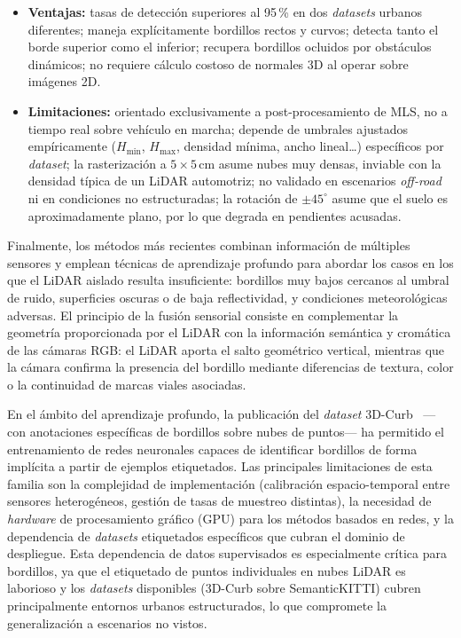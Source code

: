 \begin{itemize}
    \item \textbf{Ventajas:} tasas de detección superiores al 95\,\% en
    dos \textit{datasets} urbanos diferentes; maneja explícitamente
    bordillos rectos y curvos; detecta tanto el borde superior como el
    inferior; recupera bordillos ocluidos por obstáculos dinámicos; no
    requiere cálculo costoso de normales 3D al operar sobre imágenes
    2D.
    \item \textbf{Limitaciones:} orientado exclusivamente a
    post-procesamiento de MLS, no a tiempo real sobre vehículo en
    marcha; depende de umbrales ajustados empíricamente ($H_{\min}$,
    $H_{\max}$, densidad mínima, ancho lineal\ldots) específicos por
    \textit{dataset}; la rasterización a $5 \times 5$\,cm asume nubes
    muy densas, inviable con la densidad típica de un LiDAR automotriz;
    no validado en escenarios \textit{off-road} ni en condiciones no
    estructuradas; la rotación de $\pm 45^{\circ}$ asume que el suelo
    es aproximadamente plano, por lo que degrada en pendientes
    acusadas.
\end{itemize}

Finalmente, los métodos más recientes combinan información de múltiples
sensores y emplean técnicas de aprendizaje profundo para abordar los
casos en los que el LiDAR aislado resulta insuficiente: bordillos muy
bajos cercanos al umbral de ruido, superficies oscuras o de baja
reflectividad, y condiciones meteorológicas adversas. El principio de
la fusión sensorial consiste en complementar la geometría proporcionada
por el LiDAR con la información semántica y cromática de las cámaras
RGB: el LiDAR aporta el salto geométrico vertical, mientras que la
cámara confirma la presencia del bordillo mediante diferencias de
textura, color o la continuidad de marcas viales asociadas.

En el ámbito del aprendizaje profundo, la publicación del
\textit{dataset} 3D-Curb~\cite{zhao2024curbnet} ---con anotaciones
específicas de bordillos sobre nubes de puntos--- ha permitido el
entrenamiento de redes neuronales capaces de identificar bordillos de
forma implícita a partir de ejemplos etiquetados. Las principales
limitaciones de esta familia son la complejidad de implementación
(calibración espacio-temporal entre sensores heterogéneos, gestión de
tasas de muestreo distintas), la necesidad de \textit{hardware} de
procesamiento gráfico (GPU) para los métodos basados en redes, y la
dependencia de \textit{datasets} etiquetados específicos que cubran el
dominio de despliegue. Esta dependencia de datos supervisados es
especialmente crítica para bordillos, ya que el etiquetado de puntos
individuales en nubes LiDAR es laborioso y los \textit{datasets}
disponibles (3D-Curb sobre SemanticKITTI) cubren principalmente
entornos urbanos estructurados, lo que compromete la generalización a
escenarios no vistos.

